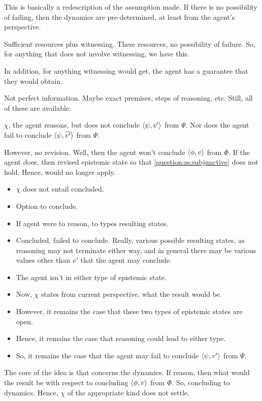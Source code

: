 \begin{note}
  This is basically a redescription of the assumption made.
  If there is no possibility of failing, then the dynamics are pre-determined, at least from the agent's perspective.





  Sufficient resources plus witnessing.
  These resources, no possibility of failure.
  So, for anything that does not involve witnessing, we have this.

  In addition, for anything witnessing would get, the agent has a guarantee that they would obtain.

  Not perfect information.
  Maybe exact premises, steps of reasoning, etc.
  Still, all of these are available. 
\end{note}



\begin{note}
  \(\chi\), the agent reasons, but does not conclude \(\langle \psi, v' \rangle\) from \(\Psi\).
  Nor does the agent fail to conclude \(\langle \psi, \overline{v'} \rangle\) from \(\Psi\).

  However, no revision.
  Well, then the agent won't conclude \(\langle \phi, v \rangle\) from \(\Phi\).
  If the agent does, then revised epistemic state so that \ref{question:zs:subjunctive} does not hold.
  Hence, \qzS{} would no longer apply.
\end{note}

\begin{note}
  \begin{itemize}
  \item
    \(\chi\) does not entail concluded.
  \item
    Option to conclude.
  \item
    If agent were to reason, to types resulting states.
  \item
    Concluded, failed to conclude.
    Really, various possible resulting states, as reasoning may not terminate either way, and in general there may be various values other than \(v'\) that the agent may conclude.
  \item
    The agent isn't in either type of epistemic state.
  \item
    Now, \(\chi\) states from current perspective, what the result would be.
  \item
    However, it remains the case that these two types of epistemic states are open.
  \item
    Hence, it remains the case that reasoning could lead to either type.
  \item
    So, it remains the case that the agent may fail to conclude \(\langle \psi, v' \rangle\) from \(\Psi\).
  \end{itemize}

  The core of the idea is that \qzS{} concerns the dynamics.
  If reason, then what would the result be with respect to concluding \(\langle \phi, v \rangle\) from \(\Phi\).
  So, concluding to dynamics.
  Hence, \(\chi\) of the appropriate kind does not settle.
\end{note}

